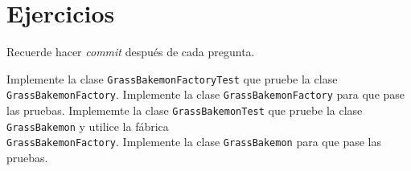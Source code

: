 \newpage
\section{Ejercicios}
\label{sec:factory_ejercicios}
  \begin{important}
    Recuerde hacer \textit{commit} después de cada pregunta.
  \end{important}

  \begin{Exercise}[title={Lo que faltó}]
    \Question Implemente la clase \texttt{GrassBakemonFactoryTest} que pruebe la clase 
      \texttt{GrassBakemonFactory}.
    \Question Implemente la clase \texttt{GrassBakemonFactory} para que pase las pruebas.
    \Question Implememte la clase \texttt{GrassBakemonTest} que pruebe la clase 
      \texttt{GrassBakemon} y utilice la fábrica \\\texttt{GrassBakemonFactory}.
    \Question Implemente la clase \texttt{GrassBakemon} para que pase las pruebas.
  \end{Exercise}


